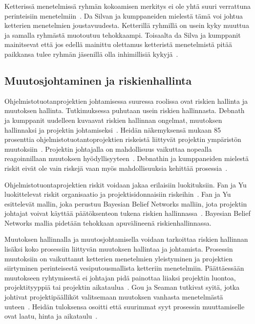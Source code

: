 \documentclass[finnish]{tktltiki2}
\theoremstyle{definition}
\theoremstyle{remark}
\begin{document}
Ketterissä menetelmissä ryhmän kokoamisen merkitys ei ole yhtä suuri verrattuna perinteisiin menetelmiin~\cite{daSilva2012}. Da Silvan ja kumppaneiden mielestä tämä voi johtua ketterien menetelmien joustavuudesta. Ketterillä ryhmillä on usein kyky muuttua ja samalla ryhmästä muotoutuu tehokkaampi. Toisaalta da Silva ja kumppanit mainitsevat että jos edellä mainittu olettamus ketteristä menetelmistä pitää paikkansa tulee ryhmän jäsenillä olla inhimillisiä kykyjä~\cite{daSilva2012}.


\subsection{Muutosjohtaminen ja riskienhallinta}

Ohjelmistotuotanprojektien johtamisessa suuressa roolissa ovat riskien hallinta ja muutoksen hallinta. Tutkimuksessa puhutaan usein riskien hallinnasta. Debnath ja kumppanit uudelleen kuvaavat riskien hallinnan ongelmat, muutoksen hallinnaksi ja projektin johtamiseksi~\cite{4017705}. Heidän näkemyksensä mukaan 85 prosenttia ohjelmistotuotantoprojektien riskeistä liittyvät projektin ympäristön muutoksiin~\cite{4017705}. Projektin johtajalla on mahdollisuus vaikuttaa nopealla reagoinnillaan muutoksen hyödyllisyyteen~\cite{4017705}. Debnathin ja kumppaneiden mielestä riskit eivät ole vain riskejä vaan myös mahdollisuuksia kehittää prosessia~\cite{4017705}.

Ohjelmistotuontaprojektien riskit voidaan jakaa erilaisiin luokituksiin. Fan ja Yu luokittelevat riskit organisaatio ja projektisidonnaisiin riskeihin~\cite{fan2004bbn}. Fan ja Yu esittelevät mallin, joka perustuu Bayesian Belief Networks malliin, jota projektin johtajat voivat käyttää päätöksenteon tukena riskien hallinnassa~\cite{fan2004bbn}. Bayesian Belief Networks mallia pidetään tehokkaan apuvälineenä riskienhallinnassa.

Muutoksen hallinnalla ja muutosjohtamisella voidaan tarkoittaa riskien hallinnan lisäksi koko prosessiin liittyvän muutoksen hallintaa ja johtamista. Prosessin muutoksiin on vaikuttanut ketterien menetelmien yleistyminen ja projektien siirtyminen perinteisestä vesiputousmallista ketteriin menetelmiin. Päättäessään muutokseen ryhtymisestä ei johtajan pidä painottaa liiaksi projektin luontoa, projektityyppiä tai projektin aikataulua~\cite{Chow2008961}. Gou ja Seaman tutkivat syitä, jotka johtivat projektipäälliköt valitsemaan muutoksen vanhasta menetelmästä uuteen~\cite{Guo:2008:SSP:1414004.1414046}. Heidän tuloksensa osoitti että suurimmat syyt prosessin muuttamiselle ovat laatu, hinta ja aikataulu~\cite{Guo:2008:SSP:1414004.1414046}.
\end{document}
